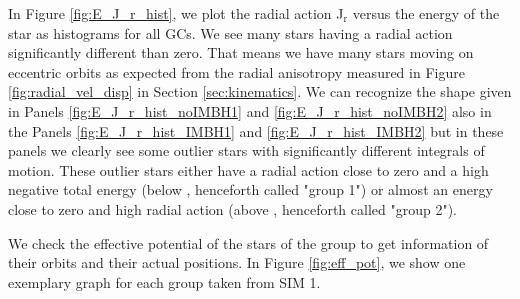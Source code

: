 In Figure \ref{fig:E_J_r_hist}, we plot the radial action J\(_\mathrm{r}\) versus the energy of the star as histograms for all \acp{GC}. We see many stars having a radial action significantly different than zero. That means we have many stars moving on eccentric orbits as expected from the radial anisotropy measured in Figure \ref{fig:radial_vel_disp} in Section \ref{sec:kinematics}. We can recognize the shape given in Panels \ref{fig:E_J_r_hist_noIMBH1} and \ref{fig:E_J_r_hist_noIMBH2} also in the Panels \ref{fig:E_J_r_hist_IMBH1} and \ref{fig:E_J_r_hist_IMBH2} but in these panels we clearly see some outlier stars with significantly different integrals of motion. These outlier stars either have a radial action close to zero and a high negative total energy (below , henceforth called "group 1") or almost an energy close to zero and high radial action (above , henceforth called "group 2"). 

\par We check the effective potential of the stars of the group to get information of their orbits and their actual positions. In Figure \ref{fig:eff_pot}, we show one exemplary graph for each group taken from SIM 1. 


